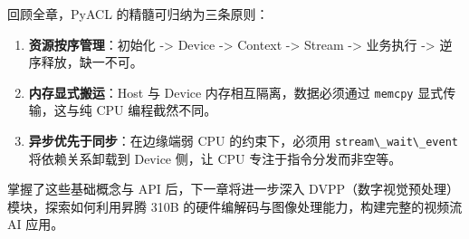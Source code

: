 回顾全章，PyACL 的精髓可归纳为三条原则：

\begin{enumerate}
\def\labelenumi{\arabic{enumi}.}
\tightlist
\item
  \textbf{资源按序管理}：初始化 -\textgreater{} Device -\textgreater{}
  Context -\textgreater{} Stream -\textgreater{} 业务执行
  -\textgreater{} 逆序释放，缺一不可。
\item
  \textbf{内存显式搬运}：Host 与 Device 内存相互隔离，数据必须通过
  \passthrough{\lstinline!memcpy!} 显式传输，这与纯 CPU 编程截然不同。
\item
  \textbf{异步优先于同步}：在边缘端弱 CPU 的约束下，必须用
  \passthrough{\lstinline!stream\_wait\_event!} 将依赖关系卸载到 Device
  侧，让 CPU 专注于指令分发而非空等。
\end{enumerate}

掌握了这些基础概念与 API 后，下一章将进一步深入
DVPP（数字视觉预处理）模块，探索如何利用昇腾 310B
的硬件编解码与图像处理能力，构建完整的视频流 AI 应用。
